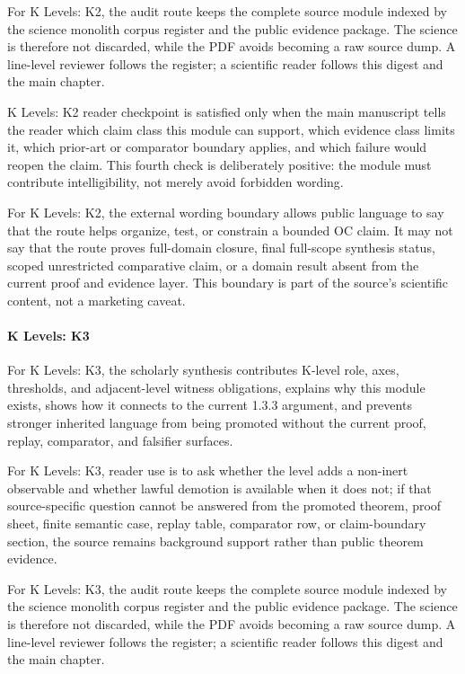 For K Levels: K2, the audit route keeps the complete source module indexed by the science monolith corpus register and the public evidence package. The science is therefore not discarded, while the PDF avoids becoming a raw source dump. A line-level reviewer follows the register; a scientific reader follows this digest and the main chapter.


K Levels: K2 reader checkpoint is satisfied only when the main manuscript tells the reader which claim class this module can support, which evidence class limits it, which prior-art or comparator boundary applies, and which failure would reopen the claim. This fourth check is deliberately positive: the module must contribute intelligibility, not merely avoid forbidden wording.


For K Levels: K2, the external wording boundary allows public language to say that the route helps organize, test, or constrain a bounded OC claim. It may not say that the route proves full-domain closure, final full-scope synthesis status, scoped unrestricted comparative claim, or a domain result absent from the current proof and evidence layer. This boundary is part of the source's scientific content, not a marketing caveat.


\paragraph{K Levels: K3}

For K Levels: K3, the scholarly synthesis contributes K-level role, axes, thresholds, and adjacent-level witness obligations, explains why this module exists, shows how it connects to the current 1.3.3 argument, and prevents stronger inherited language from being promoted without the current proof, replay, comparator, and falsifier surfaces.


For K Levels: K3, reader use is to ask whether the level adds a non-inert observable and whether lawful demotion is available when it does not; if that source-specific question cannot be answered from the promoted theorem, proof sheet, finite semantic case, replay table, comparator row, or claim-boundary section, the source remains background support rather than public theorem evidence.


For K Levels: K3, the audit route keeps the complete source module indexed by the science monolith corpus register and the public evidence package. The science is therefore not discarded, while the PDF avoids becoming a raw source dump. A line-level reviewer follows the register; a scientific reader follows this digest and the main chapter.


